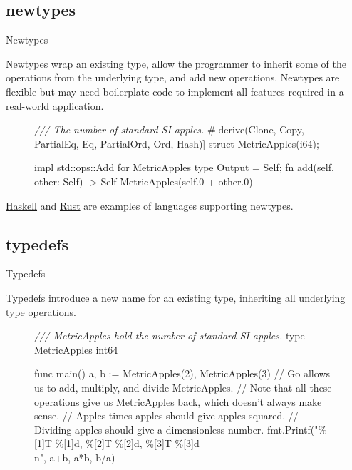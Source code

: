 \documentclass{article}
\begin{document}
\subsection{newtypes}{Newtypes}

Newtypes wrap an existing type, allow the programmer to inherit some of the operations from the underlying type, and add new operations.
Newtypes are flexible but may need boilerplate code to implement all features required in a real-world application.

\begin{figure}
\begin{code}
\emph{/// The number of standard SI apples.}
#[derive(Clone, Copy, PartialEq, Eq, PartialOrd, Ord, Hash)]
struct MetricApples(i64);

impl std::ops::Add for MetricApples {
  type Output = Self;
  fn add(self, other: Self) -> Self {
    MetricApples(self.0 + other.0)
  }
}
\end{code}
\end{figure}

\href{https://wiki.haskell.org/Newtype}{Haskell} and \href{https://doc.rust-lang.org/book/ch19-04-advanced-types.html#using-the-newtype-pattern-for-type-safety-and-abstraction}{Rust} are examples of languages supporting newtypes.

\subsection{typedefs}{Typedefs}

Typedefs introduce a new name for an existing type, inheriting all underlying type operations.

\begin{figure}
\begin{code}
\emph{/// MetricApples hold the number of standard SI apples.}
type MetricApples int64

func main() {
  a, b := MetricApples(2), MetricApples(3)
  // Go allows us to add, multiply, and divide MetricApples.
  // Note that all these operations give us MetricApples back, which doesn’t always make sense.
  // Apples times apples should give apples squared.
  // Dividing apples should give a dimensionless number.
  fmt.Printf("\%[1]T \%[1]d, \%[2]T \%[2]d, \%[3]T \%[3]d\\n", a+b, a*b, b/a)
}
\end{code}
\end{figure}
\end{document}
